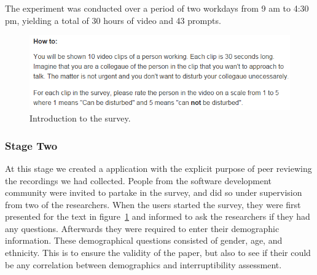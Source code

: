 \documentclass{sigchi}
\begin{document}
The experiment was conducted over a period of two workdays from 9 am to 4:30 pm, yielding a total of 30 hours of video and 43 prompts.

\begin{figure}
  \centering
  \includegraphics[width=\columnwidth]{figures/survey_introduction.png}
  \caption{Introduction to the survey.}
  \label{fig:survey_intro}
\end{figure}

\subsubsection{Stage Two}
At this stage we created a application with the explicit purpose of peer reviewing the recordings we had collected.
People from the software development community were invited to partake in the survey, and did so under supervision from two of the researchers.
When the users started the survey, they were first presented for the text in figure~\ref{fig:survey_intro} and informed to ask the researchers if they had any questions.
Afterwards they were required to enter their demographic information. 
These demographical questions consisted of gender, age, and ethnicity.
This is to ensure the validity of the paper, but also to see if their could be any correlation between demographics and interruptibility assessment.
\end{document}
